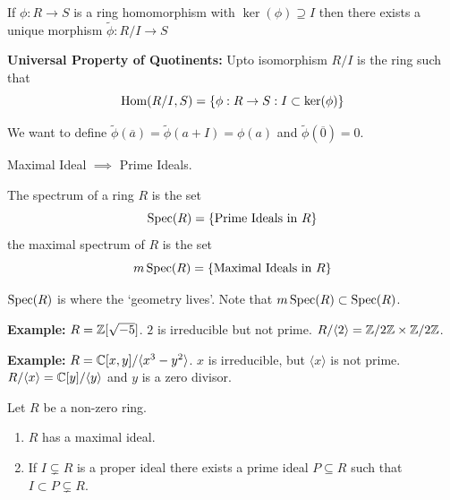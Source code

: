 \documentclass[12pt]{amsart}
\begin{document}
\begin{lemma}
    If $\phi: R \to S$ is a ring homomorphism with $\ker(\phi) \supseteq I$ then there exists a unique morphism $\widetilde{\phi}: R/I \to S$ 
    
      \begin{center}
      \end{center}
    \textbf{Universal Property of Quotinents:} Upto isomorphism $R/I$ is the ring such that 
    \[\operatorname{Hom}(R/I, S) = \{\phi: R \to S: I \subset \ker(\phi)\}\]

    We want to define $\widetilde{\phi}(\overline{a}) = \widetilde{\phi}(a + I) = \phi(a)$ and $\widetilde{\phi}(\overline{0}) = 0$. 
\end{lemma}

\begin{lemmact}
    Maximal Ideal $\implies$ Prime Ideals. 
\end{lemmact}

\begin{definition}
    The spectrum of a ring $R$ is the set 
    \[\operatorname{Spec}(R) = \{\text{Prime Ideals in } R\}\]
    the maximal spectrum of $R$ is the set 
    \[m\operatorname{Spec}(R) = \{\text{Maximal Ideals in } R\}\]
    
    $\operatorname{Spec}(R)$ is where the `geometry lives'. 
    Note that $m\operatorname{Spec}(R) \subset \operatorname{Spec}(R)$. 

    \textbf{Example:} $R = \mathbb Z[\sqrt{-5}]$. $2$ is irreducible but not prime. $R/ \langle 2 \rangle = \mathbb Z / 2\mathbb Z \times \mathbb Z/2\mathbb Z$. 
    
    \textbf{Example:} $R = \mathbb C[x,y] / \langle x^3 - y^2 \rangle $. $x$ is irreducible, but $\langle x \rangle$ is not prime. $R / \langle x \rangle = \mathbb C[y]/ \langle y \rangle$ and $y$ is a zero divisor.   
\end{definition}

\begin{theorem}
    Let $R$ be a non-zero ring. \begin{enumerate}
        \item $R$ has a maximal ideal. 
        \item If $I \subsetneq R$ is a proper ideal there exists a prime ideal $P\subseteq R$ such that $I \subset P \subsetneq R$.  
    \end{enumerate}
\end{theorem}
\end{document}
